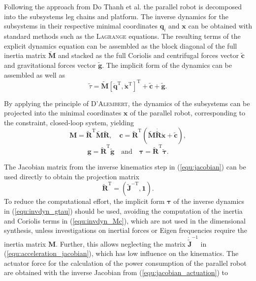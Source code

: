 \documentclass[fleqn,a4paper,10pt]{article}
\newcommand{\bm}[1]{\mathbf{#1}}
\newcommand{\transp}[0]{{\mathrm{T}}}
\begin{document}
\begin{multicols}{2}
Following the approach from Do Thanh et al. \cite{DoThanhKotHeiOrt2009b} the parallel robot is decomposed into the subsystems leg chains and platform.
The inverse dynamics for the subsystems in their respective minimal coordinates $\bm{q}_i$ and $\bm{x}$ can be obtained with standard methods such as the \textsc{Lagrange} equations.
The resulting terms of the explicit dynamics equation can be assembled as the block diagonal of the full inertia matrix $\tilde{\bm{M}}$ and stacked as the full Coriolis and centrifugal forces vector $\tilde{\bm{c}}$ and gravitational forces vector $\tilde{\bm{g}}$.
The implicit form of the dynamics can be assembled as well as
\begin{equation}
\tilde{\tau} = \tilde{\bm{M}} [\ddot{\bm{q}}^\transp, \ddot{\bm{x}}^\transp]^\transp + \tilde{\bm{c}} + \tilde{\bm{g}}.
\label{equ:subsys_implicit_dyn}
\end{equation}


By applying the principle of \textsc{D'Alembert}, the dynamics of the subsystems can be projected into the minimal coordinates $\bm{x}$ of the parallel robot, corresponding to the constraint, closed-loop system, yielding
\begin{equation}
\bm{M}=\tilde{\bm{R}}^\transp\tilde{\bm{M}}\tilde{\bm{R}}, \quad
\bm{c}=\tilde{\bm{R}}^\transp (\tilde{\bm{M}}\dot{\tilde{\bm{R}}}\dot{\bm{x}}+\tilde{\bm{c}}),
\label{equ:invdyn_Mc}
\end{equation}
%
\begin{equation}
\bm{g}=\tilde{\bm{R}}^\transp\tilde{\bm{g}} \quad \mathrm{and} \quad 
\bm{\tau}=\tilde{\bm{R}}^\transp\tilde{\bm{\tau}}.
\label{equ:invdyn_gtau}
\end{equation}

The Jacobian matrix from the inverse kinematics step in (\ref{equ:jacobian}) can be used directly to obtain the projection matrix
%
\begin{equation}
\tilde{\bm{R}}^\transp=\left(\tilde{\bm{J}}^{-\transp},\bm{1}\right).
\label{equ:dyn_projection_matrix}
\end{equation}
%
To reduce the computational effort, the implicit form $\bm{\tau}$ of the inverse dynamics in (\ref{equ:invdyn_gtau}) should be used, avoiding the computation of the inertia and Coriolis terms in (\ref{equ:invdyn_Mc}), which are not used in the dimensional synthesis, unless investigations on inertial forces \cite{FrindtKreHes2010} or Eigen frequencies \cite{JamwalHusXie2015} require the inertia matrix $\bm{M}$.
Further, this allows neglecting the matrix $\dot{\tilde{\bm{J}}}^{-1}$ in (\ref{equ:acceleration_jacobian}), which has low influence on the kinematics.
The actuator force for the calculation of the power consumption of the parallel robot are obtained with the inverse Jacobian from (\ref{equ:jacobian_actuation}) to


\end{multicols}
\end{document}

